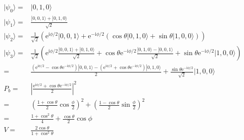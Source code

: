 \documentclass[10pt,fleqn]{article}
\newcommand{\ue}{\mathrm{e}}
\newcommand{\ui}{\mathrm{i}}
\newcommand{\eqar}[1]
{
  \begin{align*}
    #1
  \end{align*}
}
\newcommand{\paren}[1]{{\left({#1}\right)}}
\newcommand{\abs}[1]{{\left|{#1}\right|}}
\begin{document}
\subsection{}
\eqar{
  |\psi_0\rangle=&|0, 1, 0\rangle\\
  |\psi_1\rangle=&\frac{|0, 0, 1\rangle+|0, 1, 0\rangle}{\sqrt2}\\
  |\psi_2\rangle=&\frac{1}{\sqrt2}\paren{\ue^{\ui\phi/2}|0, 0, 1\rangle+\ue^{-\ui\phi/2}\paren{\cos\theta|0, 1, 0\rangle+\sin\theta|1, 0, 0\rangle}}\\
  |\psi_3\rangle=&\frac{1}{\sqrt2}\paren{
    \ue^{\ui\phi/2}\frac{|0, 0, 1\rangle+|0, 1, 0\rangle}{\sqrt2}
    +\cos\theta\ue^{-\ui\phi/2}\frac{|0, 1, 0\rangle-|0, 0, 1\rangle}{\sqrt2}
    +\sin\theta\ue^{-\ui\phi/2}|1, 0, 0\rangle}\\
  =&\frac{\paren{\ue^{\ui\phi/2}-\cos\theta\ue^{-\ui\phi/2}}|0, 0, 1\rangle-\paren{\ue^{\ui\phi/2}+\cos\theta\ue^{-\ui\phi/2}}|0, 1, 0\rangle}{2}
  +\frac{\sin\theta\ue^{-\ui\phi/2}}{\sqrt2}|1, 0, 0\rangle\\
  P_b=&\abs{\frac{\ue^{\ui\phi/2}+\cos\theta\ue^{-\ui\phi/2}}{2}}^2\\
  =&\paren{\frac{1+\cos\theta}{2}\cos\frac{\phi}{2}}^2+\paren{\frac{1-\cos\theta}{2}\sin\frac{\phi}{2}}^2\\
  =&\frac{1+\cos^2\theta}{4}+\frac{\cos\theta}{2}\cos\phi\\
  V=&\frac{2\cos\theta}{1+\cos^2\theta}
}
\end{document}
